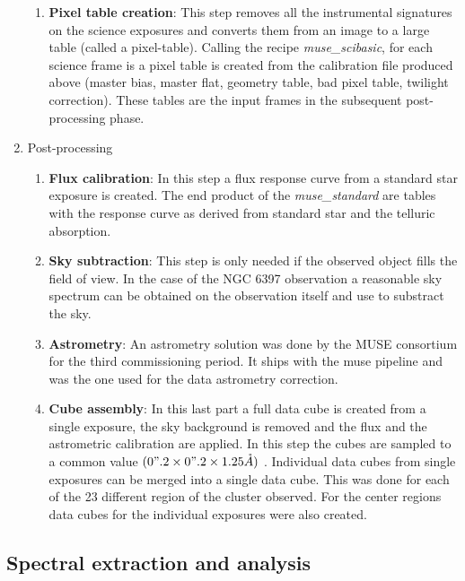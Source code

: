 \begin{enumerate}
\begin{enumerate}[I]
    \item{\textbf{Pixel table creation}}: This step removes all the instrumental signatures on the science exposures and converts them from an image to a large table (called a pixel-table). Calling the recipe \emph{muse\_scibasic}, for each science frame is a pixel table is created from the calibration file produced above (master bias, master flat, geometry table, bad pixel table, twilight correction). These tables are the input frames in the subsequent post-processing phase.
    \end{enumerate}
    
\item Post-processing
                \begin{enumerate}[I]
			\item \textbf{Flux calibration}:  In this step a flux response curve from a standard star exposure is created. The end product of the \emph{muse\_standard} are tables with the response curve as derived from standard star and the telluric absorption.
                        \item \textbf{Sky subtraction}: This step is only needed if the observed object fills the field of view. In the case of the NGC 6397 observation a reasonable sky spectrum can be obtained on the observation itself and use to substract the sky.   
                        \item \textbf{Astrometry}: An astrometry solution was done by the MUSE consortium for the third commissioning period. It ships with the muse pipeline and was the one used for the data astrometry correction.  
          
			\item \textbf{Cube assembly}: In this last part a full data cube is created from a single exposure, the sky background is removed and the flux and the astrometric calibration are applied. In this step the cubes are sampled to a common value $(0".2 \times 0".2 \times 1.25 \mathring{A})$ . Individual data cubes from single exposures can be merged into a single data cube. This was done for each of the 23 different region of the cluster observed. For the center regions data cubes for the individual exposures were also created.  
                \end{enumerate}
\end{enumerate}


\subsection{Spectral extraction and analysis}

